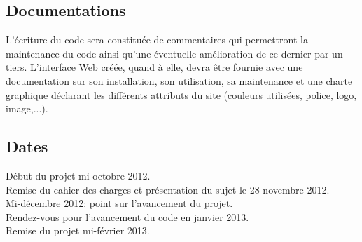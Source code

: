 \subsection{Documentations}
L'écriture du code sera constituée de commentaires qui permettront la maintenance du code ainsi qu'une éventuelle amélioration de ce dernier par un tiers.
L'interface Web créée, quand à elle, devra être fournie avec une documentation sur son installation, son utilisation, sa maintenance et une charte graphique déclarant les différents attributs du site (couleurs utilisées, police, logo, image,...).

\subsection{Dates}
Début du projet mi-octobre 2012. \\
Remise du cahier des charges et présentation du sujet le 28 novembre 2012.  \\
Mi-décembre 2012: point sur l'avancement du projet.\\
Rendez-vous pour l'avancement du code en janvier 2013.\\
Remise du projet mi-février 2013.